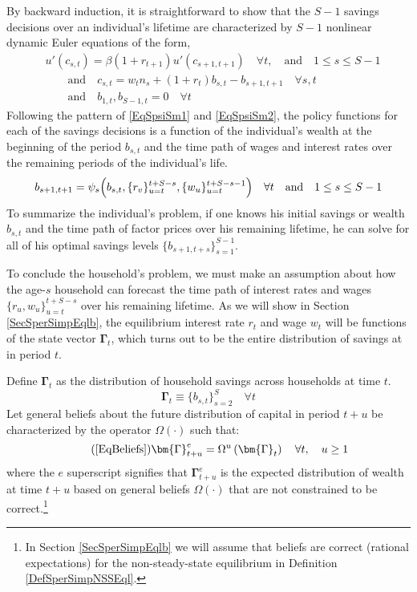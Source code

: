 \documentclass[letterpaper,12pt]{article}
\theoremstyle{definition}
\numberwithin{equation}{section}
\numberwithin{exercise}{section}
\begin{document}
\begin{spacing}{1.5}
      By backward induction, it is straightforward to show that the $S-1$ savings decisions over an individual's lifetime are characterized by $S-1$ nonlinear dynamic Euler equations of the form,
      \begin{equation}\label{EqSeulGen}
         \begin{split}
            &u'(c_{s,t}) = \beta(1+r_{t+1})u'(c_{s+1,t+1}) \quad\forall t,\quad\text{and}\quad 1\leq s\leq S-1 \\
            &\qquad\text{and}\quad c_{s,t} = w_t n_s + (1 + r_{t})b_{s,t} - b_{s+1,t+1} \quad\forall s,t \\
            &\qquad\text{and}\quad b_{1,t},b_{S-1,t} = 0 \quad\forall t
         \end{split}
      \end{equation}
      Following the pattern of \eqref{EqSpsiSm1} and \eqref{EqSpsiSm2}, the policy functions for each of the savings decisions is a function of the individual's wealth at the beginning of the period $b_{s,t}$ and the time path of wages and interest rates over the remaining periods of the individual's life.
      \begin{equation}\label{EqSpsiGen}
         b_{s+1,t+1} = \psi_{s}\Bigl(b_{s,t}, \{r_v\}_{u=t}^{t+S-s}, \{w_u\}_{u=t}^{t+S-s-1}\Bigr) \quad\forall t \quad\text{and}\quad 1\leq s\leq S-1
      \end{equation}
      To summarize the individual's problem, if one knows his initial savings or wealth $b_{s,t}$ and the time path of factor prices over his remaining lifetime, he can solve for all of his optimal savings levels $\{b_{s+1,t+s}\}_{s=1}^{S-1}$.

      To conclude the household's problem, we must make an assumption about how the age-$s$ household can forecast the time path of interest rates and wages $\{r_u, w_u\}_{u=t}^{t+S-s}$ over his remaining lifetime. As we will show in Section \ref{SecSperSimpEqlb}, the equilibrium interest rate $r_t$ and wage $w_t$ will be functions of the state vector $\bm{\Gamma}_t$, which turns out to be the entire distribution of savings at in period $t$.

      Define $\bm{\Gamma}_t$ as the distribution of household savings across households at time $t$.
      \begin{equation}\label{EqSsavDist}
         \bm{\Gamma}_t \equiv \bigl\{b_{s,t}\bigr\}_{s=2}^S \quad\forall t
      \end{equation}
      Let general beliefs about the future distribution of capital in period $t+u$ be characterized by the operator $\Omega(\cdot)$ such that:
      \begin{equation}\tag{\ref{EqBeliefs}}
         \bm{\Gamma}^e_{t+u} = \Omega^u\left(\bm{\Gamma}_t\right) \quad \forall t, \quad u\geq 1
      \end{equation}
      where the $e$ superscript signifies that $\bm{\Gamma}^e_{t+u}$ is the expected distribution of wealth at time $t+u$ based on general beliefs $\Omega(\cdot)$ that are not constrained to be correct.\footnote{In Section \ref{SecSperSimpEqlb} we will assume that beliefs are correct (rational expectations) for the non-steady-state equilibrium in Definition \ref{DefSperSimpNSSEql}.}



\end{spacing}
\end{document}
